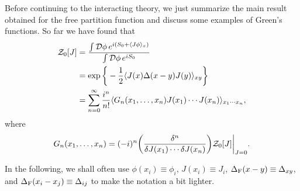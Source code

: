 Before continuing to the interacting theory, we just summarize the main result obtained for the free partition function and discuss some examples of Green's functions. So far we have found that 
\begin{equation}
    \begin{split}
        \mathcal{Z}_0[J] &= \frac{\int \mathcal{D}\phi\,e^{i(S_0 + \langle J\phi \rangle_x)}}{\int \mathcal{D}\phi\,e^{iS_0}} \\
        &= \exp{\bigg\{-\frac{1}{2}\langle J(x)\Delta(x - y)J(y) \rangle_{xy}\bigg\}} \\
        &= \sum_{n = 0}^\infty \frac{i^n}{n!}\langle G_n(x_1,\dots,x_n)J(x_1)\cdots J(x_n) \rangle_{x_1\cdots x_n},
    \end{split}
\end{equation}
where 
\begin{equation}
    G_n(x_1,\dots,x_n) = (-i)^n\bigg(\frac{\delta^n}{\delta J(x_1)\cdots \delta J(x_n)}\bigg)\mathcal{Z}_0[J]\bigg|_{J = 0}.
\end{equation}
\begin{notz}
    In the following, we shall often use $\phi(x_i) \equiv \phi_i$, $J(x_i) \equiv J_i$, $\Delta_{\mathrm{F}}(x - y) \equiv \Delta_{xy}$, and $\Delta_{\mathrm{F}}(x_i - x_j) \equiv \Delta_{ij}$ to make the notation a bit lighter.
\end{notz}
